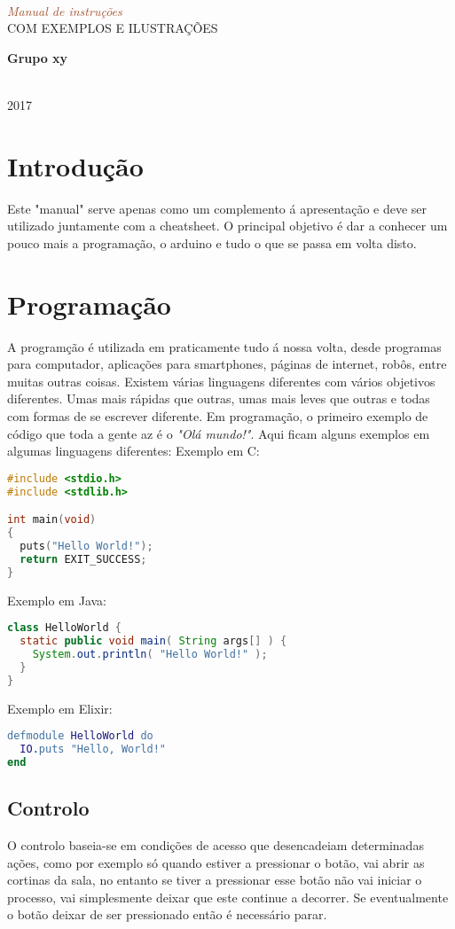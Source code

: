 \documentclass{article}
\newcommand*{\plogo}{\fbox{$\mathcal{ED}$}} %
\newcommand*{\rotrt}[1]{\rotatebox{90}{#1}} %
\newcommand*{\rotlft}[1]{\rotatebox{-90}{#1}} %
\newcommand*{\titleBC}{\begingroup %
\centering %

\def\CP{\textit{\Huge Manual de instruções}} %

\settowidth{\unitlength}{\CP} %
{\color{LightGoldenrod}\resizebox*{\unitlength}{\baselineskip}{\rotrt{$\}$}}} \\[\baselineskip] %
\textcolor{Sienna}{\CP} \\[\baselineskip] %
{\color{RosyBrown}\Large COM EXEMPLOS E ILUSTRAÇÕES} \\ %
{\color{LightGoldenrod}\resizebox*{\unitlength}{\baselineskip}{\rotlft{$\}$}}} %

\vfill %

{\Large\textbf{Grupo xy}}\\ %

\vfill %

\plogo\\[0.5\baselineskip] %
2017 %

\endgroup}
\begin{document}
\pagestyle{empty} %
\titleBC %

\pagebreak
\tableofcontents
\pagebreak

\section{Introdução}
Este "manual" serve apenas como um complemento á apresentação e deve ser utilizado juntamente com a cheatsheet. O principal objetivo é dar a conhecer um pouco mais a programação, o arduino e tudo o que se passa em volta disto.

\section{Programação}
A programção é utilizada em praticamente tudo á nossa volta, desde programas para computador, aplicações para smartphones, páginas de internet, robôs, entre muitas outras coisas.\newline
Existem várias linguagens diferentes com vários objetivos diferentes. Umas mais rápidas que outras, umas mais leves que outras e todas com formas de se escrever diferente.\newline
Em programação, o primeiro exemplo de código que toda a gente az é o \textit{"Olá mundo!"}. Aqui ficam alguns exemplos em algumas linguagens diferentes:\newline
Exemplo em C:
\begin{lstlisting}[language=C]
#include <stdio.h>
#include <stdlib.h>

int main(void)
{
  puts("Hello World!");
  return EXIT_SUCCESS;
}
\end{lstlisting}
Exemplo em Java:
\begin{lstlisting}[language=Java]
class HelloWorld {
  static public void main( String args[] ) {
    System.out.println( "Hello World!" );
  }
}
\end{lstlisting}
Exemplo em Elixir:
\begin{lstlisting}[language=erlang]
defmodule HelloWorld do
  IO.puts "Hello, World!"
end
\end{lstlisting}

\subsection{Controlo}
O controlo baseia-se em condições de acesso que desencadeiam determinadas ações, como por exemplo só quando estiver a pressionar o botão, vai abrir as cortinas da sala, no entanto se tiver a pressionar esse botão não vai iniciar o processo, vai simplesmente deixar que este continue a decorrer. Se eventualmente o botão deixar de ser pressionado então é necessário parar.\newline
\end{document}
